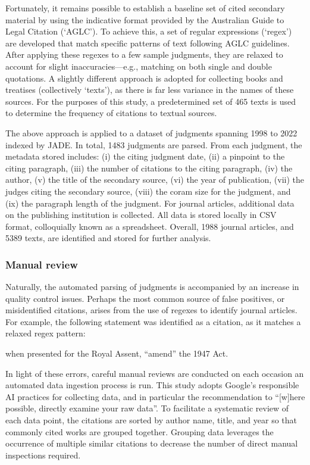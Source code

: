 Fortunately, it remains possible to establish a baseline set of cited secondary material by using the indicative format provided by the Australian Guide to Legal Citation (`AGLC'). To achieve this, a set of regular expressions (`regex') are developed that match specific patterns of text following AGLC guidelines. After applying these regexes to a few sample judgments, they are relaxed to account for slight inaccuracies---e.g., matching on both single and double quotations. A slightly different approach is adopted for collecting books and treatises (collectively `texts'), as there is far less variance in the names of these sources. For the purposes of this study, a predetermined set of 465 texts is used to determine the frequency of citations to textual sources.

The above approach is applied to a dataset of judgments spanning 1998 to 2022 indexed by JADE. In total, 1483 judgments are parsed. From each judgment, the metadata stored includes: (i) the citing judgment date, (ii) a pinpoint to the citing paragraph, (iii) the number of citations to the citing paragraph, (iv) the author, (v) the title of the secondary source, (vi) the year of publication, (vii) the judges citing the secondary source, (viii) the coram size for the judgment, and (ix) the paragraph length of the judgment. For journal articles, additional data on the publishing institution is collected. All data is stored locally in CSV format, colloquially known as a spreadsheet. Overall, 1988 journal articles, and 5389 texts, are identified and stored for further analysis.

\subsubsection{Manual review}

Naturally, the automated parsing of judgments is accompanied by an increase in quality control issues. Perhaps the most common source of false positives, or misidentified citations, arises from the use of regexes to identify journal articles. For example, the following statement was identified as a citation, as it matches a relaxed regex pattern:

\begin{center}
when presented for the Royal Assent, ``amend'' the 1947 Act.
\end{center}

In light of these errors, careful manual reviews are conducted on each occasion an automated data ingestion process is run. This study adopts Google's responsible AI practices for collecting data, and in particular the recommendation to ``[w]here possible, directly examine your raw data''. To facilitate a systematic review of each data point, the citations are sorted by author name, title, and year so that commonly cited works are grouped together. Grouping data leverages the occurrence of multiple similar citations to decrease the number of direct manual inspections required.

